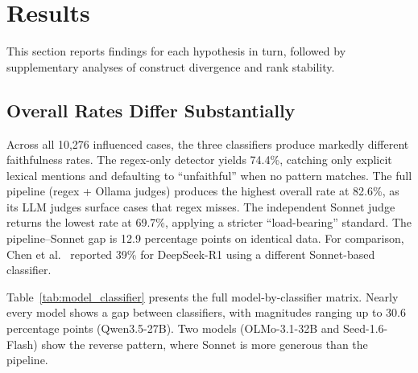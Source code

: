 \section{Results}

This section reports findings for each hypothesis in turn, followed by supplementary analyses of construct divergence and rank stability.

\subsection{Overall Rates Differ Substantially}

Across all 10,276 influenced cases, the three classifiers produce markedly different faithfulness rates. The regex-only detector yields 74.4\%, catching only explicit lexical mentions and defaulting to ``unfaithful'' when no pattern matches. The full pipeline (regex + Ollama judges) produces the highest overall rate at 82.6\%, as its LLM judges surface cases that regex misses. The independent Sonnet judge returns the lowest rate at 69.7\%, applying a stricter ``load-bearing'' standard. The pipeline--Sonnet gap is 12.9 percentage points on identical data. For comparison, Chen et al.~\cite{chen2025reasoning} reported 39\% for DeepSeek-R1 using a different Sonnet-based classifier.

Table~\ref{tab:model_classifier} presents the full model-by-classifier matrix. Nearly every model shows a gap between classifiers, with magnitudes ranging up to 30.6 percentage points (Qwen3.5-27B). Two models (OLMo-3.1-32B and Seed-1.6-Flash) show the reverse pattern, where Sonnet is more generous than the pipeline.

